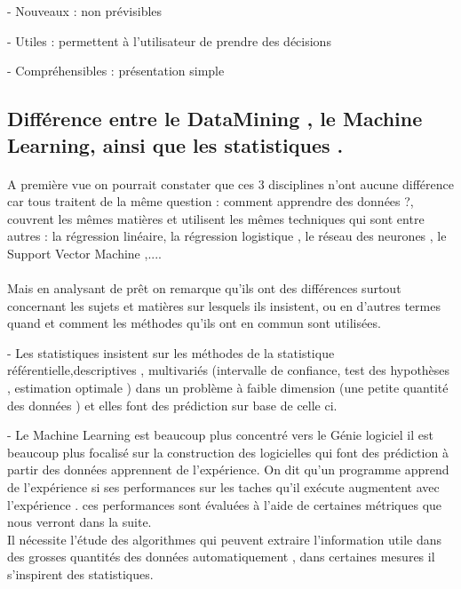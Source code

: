 - 	Nouveaux : non prévisibles 

-	Utiles :       permettent à l'utilisateur de prendre des décisions

-	Compréhensibles : présentation simple

\subsection{  Différence entre le DataMining , le Machine Learning, ainsi que les statistiques .} 
	{\cite{differenceMLDM2} \cite{differenceMLDM} \cite{differenceMLDMStack}}
\paragraph{}
A première vue on pourrait constater que ces 3 disciplines n'ont aucune différence car tous traitent de la même question : comment apprendre des données ?, couvrent les mêmes matières et utilisent les mêmes techniques qui sont entre autres : la régression linéaire, la régression logistique  , le réseau des neurones , le Support Vector Machine ,....
\paragraph{} 
Mais en analysant de prêt on remarque qu'ils ont des différences surtout concernant les sujets et matières sur lesquels ils insistent, ou en d'autres termes quand et comment les méthodes qu'ils ont en commun sont utilisées.

- Les statistiques insistent sur les méthodes de la  statistique référentielle,descriptives , multivariés  (intervalle de confiance, test des hypothèses , estimation optimale )  dans un problème à faible dimension (une petite quantité des données ) et elles font des prédiction sur base de celle ci.\cite{differenceMLDM}

- Le Machine Learning est beaucoup plus concentré vers le Génie logiciel il est beaucoup plus focalisé sur la construction des logicielles qui font des prédiction à partir des données apprennent de l'expérience. On dit qu'un programme apprend de l'expérience si ses performances sur les taches qu'il exécute augmentent avec l'expérience . ces performances sont évaluées à l'aide de certaines métriques que nous verront dans la suite.\\
Il nécessite l'étude des algorithmes qui peuvent extraire l'information utile dans des grosses quantités des données automatiquement , dans certaines mesures il s'inspirent des statistiques. \cite{differenceMLDMStack}   

